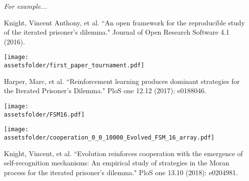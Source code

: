 \documentclass{beamer}
\newcommand{\assetsfolder}{./assets}
\begin{document}
    \begin{frame}
    \begin{center}
        \scalebox{.8}{
            
                     }
    \end{center}
    \end{frame}

	\begin{frame}
		\Huge
		\begin{center}
			\textit {For example...}
		\end{center}

	\end{frame}


    \begin{frame}
  \begin{block}{}
  Knight, Vincent Anthony, et al. ``An open framework for the
        reproducible study of the iterated prisoner's dilemma." Journal of Open
        Research Software 4.1 (2016).
  \end{block}
        \begin{center}
            \texttt{[image: \\assetsfolder/first\_paper\_tournament.pdf]}
        \end{center}
    \end{frame}

    \begin{frame}
  \begin{block}{}
    Harper, Marc, et al. ``Reinforcement learning produces dominant strategies for the Iterated Prisoner’s Dilemma." PloS one 12.12 (2017): e0188046.
  \end{block}
        \begin{center}
            \texttt{[image: \\assetsfolder/FSM16.pdf]}
        \end{center}
    \end{frame}
    
    \begin{frame}
        \begin{center}
            \texttt{[image: \\assetsfolder/cooperation\_0\_0\_10000\_Evolved\_FSM\_16\_array.pdf]}
        \end{center}
    \end{frame}

    \begin{frame}
  \begin{block}{}
Knight, Vincent, et al. ``Evolution reinforces cooperation with the emergence of self-recognition mechanisms: An empirical study of strategies in the Moran process for the iterated prisoner’s dilemma." PloS one 13.10 (2018): e0204981.
  \end{block}
    \begin{center}
        \scalebox{.45}{
            
                     }
    \end{center}
    \end{frame}
\end{document}
